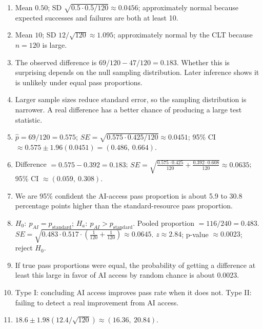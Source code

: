 \documentclass[11pt]{article}
\begin{document}
\begin{enumerate}[leftmargin=*]
\item Mean $0.50$; SD $\sqrt{0.5 \cdot 0.5 / 120} \approx 0.0456$;
approximately normal because expected successes and failures are
both at least 10.

\item Mean $10$; SD $12/\sqrt{120} \approx 1.095$; approximately
normal by the CLT because $n = 120$ is large.

\item The observed difference is $69/120 - 47/120 = 0.183$. Whether
this is surprising depends on the null sampling distribution.
Later inference shows it is unlikely under equal pass proportions.

\item Larger sample sizes reduce standard error, so the sampling
distribution is narrower. A real difference has a better chance
of producing a large test statistic.

\item $\hat{p} = 69/120 = 0.575$;
$SE = \sqrt{0.575 \cdot 0.425 / 120} \approx 0.0451$;
95\% CI $\approx 0.575 \pm 1.96(0.0451) = (0.486,\ 0.664)$.

\item Difference $= 0.575 - 0.392 = 0.183$;
$SE = \sqrt{\frac{0.575 \cdot 0.425}{120} + \frac{0.392 \cdot 0.608}{120}} \approx 0.0635$;
95\% CI $\approx (0.059,\ 0.308)$.

\item We are 95\% confident the AI-access pass proportion is about
5.9 to 30.8 percentage points higher than the standard-resource
pass proportion.

\item $H_0\!:\ p_{AI} = p_{\text{standard}}$;
$H_a\!:\ p_{AI} > p_{\text{standard}}$.
Pooled proportion $= 116/240 = 0.483$.
$SE = \sqrt{0.483 \cdot 0.517 \cdot (\tfrac{1}{120} + \tfrac{1}{120})} \approx 0.0645$.
$z \approx 2.84$; p-value $\approx 0.0023$; reject $H_0$.

\item If true pass proportions were equal, the probability of getting
a difference at least this large in favor of AI access by random
chance is about 0.0023.

\item Type I: concluding AI access improves pass rate when it does
not. Type II: failing to detect a real improvement from AI access.

\item $18.6 \pm 1.98(12.4/\sqrt{120}) \approx (16.36,\ 20.84)$.


\end{enumerate}
\end{document}
